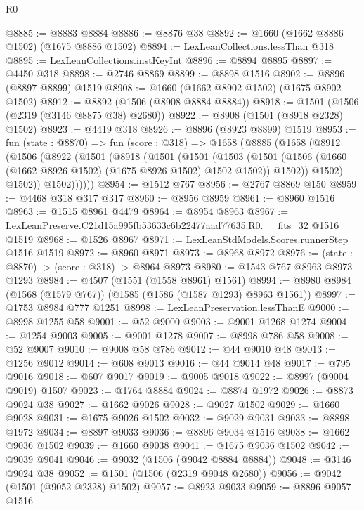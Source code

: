 \begin{lexlean}{R0}
\begin{coremodule}
@8885 := @8883 @8884
@8886 := @8876 @38
@8892 := @1660 (@1662 @8886 @1502) (@1675 @8886 @1502)
@8894 := LexLeanCollections.lessThan @318
@8895 := LexLeanCollections.instKeyInt
@8896 := @8894 @8895
@8897 := @4450 @318
@8898 := @2746 @8869
@8899 := @8898 @1516
@8902 := @8896 (@8897 @8899) @1519
@8908 := @1660 (@1662 @8902 @1502) (@1675 @8902 @1502)
@8912 := @8892 (@1506 (@8908 @8884 @8884))
@8918 := @1501 (@1506 (@2319 (@3146 @8875 @38) @2680))
@8922 := @8908 (@1501 (@8918 @2328) @1502)
@8923 := @4419 @318
@8926 := @8896 (@8923 @8899) @1519
@8953 := fun (state : @8870) =>
  fun (score : @318) =>
  @1658
    (@8885
      (@1658
        (@8912
          (@1506
            (@8922
              (@1501
                (@8918
                  (@1501
                    (@1501
                      (@1503
                        (@1501
                          (@1506 (@1660 (@1662 @8926 @1502) (@1675 @8926 @1502) @1502 @1502))
                          @1502))
                      @1502)
                    @1502))
                @1502))))))
@8954 := @1512 @767
@8956 := @2767 @8869 @150
@8959 := @4468 @318 @317 @317
@8960 := @8956 @8959
@8961 := @8960 @1516
@8963 := @1515 @8961 @4479
@8964 := @8954 @8963
@8967 := LexLeanPreserve.C21d15a995fb53633c6b22477aad77635.R0.__fits_32 @1516 @1519
@8968 := @1526 @8967
@8971 := LexLeanStdModels.Scores.runnerStep @1516 @1519
@8972 := @8960 @8971
@8973 := @8968 @8972
@8976 := (state : @8870) -> (score : @318) -> @8964 @8973
@8980 := @1543 @767 @8963 @8973 @1293
@8984 := @4507 (@1551 (@1558 @8961) @1561)
@8994 := @8980 @8984 (@1568 (@1579 @767)) (@1585 (@1586 (@1587 @1293) @8963 @1561))
@8997 := @1753 @8984 @777 @1251
@8998 := LexLeanPreservation.lessThanE
@9000 := @8998 @1255 @58
@9001 := @52 @9000
@9003 := @9001 @1268 @1274
@9004 := @1254 @9003
@9005 := @9001 @1278
@9007 := @8998 @786 @58
@9008 := @52 @9007
@9010 := @9008 @58 @786
@9012 := @44 @9010 @48
@9013 := @1256 @9012
@9014 := @608 @9013
@9016 := @44 @9014 @48
@9017 := @795 @9016
@9018 := @607 @9017
@9019 := @9005 @9018
@9022 := @8997 (@9004 @9019) @1507
@9023 := @1764 @8884
@9024 := @8874 @1972
@9026 := @8873 @9024 @38
@9027 := @1662 @9026
@9028 := @9027 @1502
@9029 := @1660 @9028
@9031 := @1675 @9026 @1502
@9032 := @9029 @9031
@9033 := @8898 @1972
@9034 := @8897 @9033
@9036 := @8896 @9034 @1516
@9038 := @1662 @9036 @1502
@9039 := @1660 @9038
@9041 := @1675 @9036 @1502
@9042 := @9039 @9041
@9046 := @9032 (@1506 (@9042 @8884 @8884))
@9048 := @3146 @9024 @38
@9052 := @1501 (@1506 (@2319 @9048 @2680))
@9056 := @9042 (@1501 (@9052 @2328) @1502)
@9057 := @8923 @9033
@9059 := @8896 @9057 @1516

\end{coremodule}
\end{lexlean}
